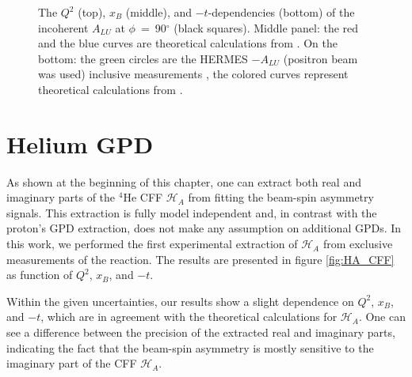 \begin{figure}[tpb]
\caption{The $Q^{2}$ (top), $x_{B}$ (middle), and $-t$-dependencies (bottom) of 
   the incoherent $A_{LU}$ at $\phi$~=~90$^{\circ}$ (black squares). Middle 
   panel: the red and the blue curves are theoretical calculations from 
   \cite{simonetta_2}. On the bottom: the green circles are the HERMES 
   $-A_{LU}$ (positron beam was used) inclusive measurements \cite{HERMES_BSA}, 
   the colored curves represent theoretical calculations from 
\cite{simonetta_2}.  } \label{fig:incoh_Q2_xB_t_ALU}
\end{figure}


\section{Helium GPD}
As shown at the beginning of this chapter, one can extract both real and
imaginary parts of the $^4$He CFF $\mathcal{H}_A$ from fitting the beam-spin 
asymmetry signals. This extraction is fully model independent and, in contrast 
with the proton's GPD extraction, does not make any assumption on additional 
GPDs. In this work, we performed the first experimental extraction of 
$\mathcal{H}_A$ from exclusive measurements of the reaction. The results are 
presented in figure \ref{fig:HA_CFF} as function of $Q^{2}$, $x_B$, and $-t$.

Within the given uncertainties, our results show a slight dependence on 
$Q^{2}$, $x_B$, and $-t$, which are in agreement with the theoretical 
calculations for $\mathcal{H}_A$.  One can see a difference between the 
precision of the extracted real and imaginary parts, indicating the fact that 
the beam-spin asymmetry is mostly sensitive to the imaginary part of the CFF 
$\mathcal{H}_A$.

